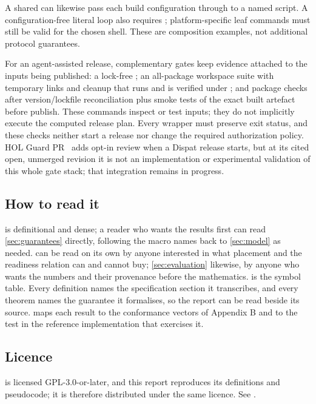 A shared 
can likewise pass each build configuration through  to a
named script. A configuration-free literal  loop also requires
; platform-specific leaf commands must still be valid for the
chosen shell. These are composition examples, not additional protocol guarantees.

For an agent-assisted release, complementary gates keep evidence attached to
the inputs being published: a lock-free
; an all-package workspace suite
with temporary links and cleanup that runs and is verified under
; and package checks after version/lockfile reconciliation plus
smoke tests of the exact built artefact before publish. These commands inspect
or test inputs; they do not implicitly execute the computed release plan. Every wrapper must
preserve exit status, and these checks neither start a release nor change the
required authorization policy. HOL Guard PR~\cite{holguard} adds opt-in review
when a Dispat release starts, but at its cited open, unmerged revision it is not
an implementation or experimental validation of this whole gate stack; that
integration remains in progress.

\subsection{How to read it}

 is definitional and dense; a reader who wants the results
first can read \cref{sec:guarantees} directly, following the macro names back
to \cref{sec:model} as needed.  can be read on its own by
anyone interested in what placement and the readiness relation can and cannot
buy; \cref{sec:evaluation} likewise, by anyone who wants the numbers and their
provenance before the mathematics.  is the symbol
table. Every definition names the specification section it transcribes, and
every theorem names the guarantee it formalises, so the report can be read
beside its source.  maps each result to the conformance
vectors of \SPEC{} Appendix B and to the test in the reference implementation
that exercises it.

\subsection{Licence}

\SPEC{} is licensed GPL-3.0-or-later, and this report reproduces its
definitions and pseudocode; it is therefore distributed under the same licence.
See .
